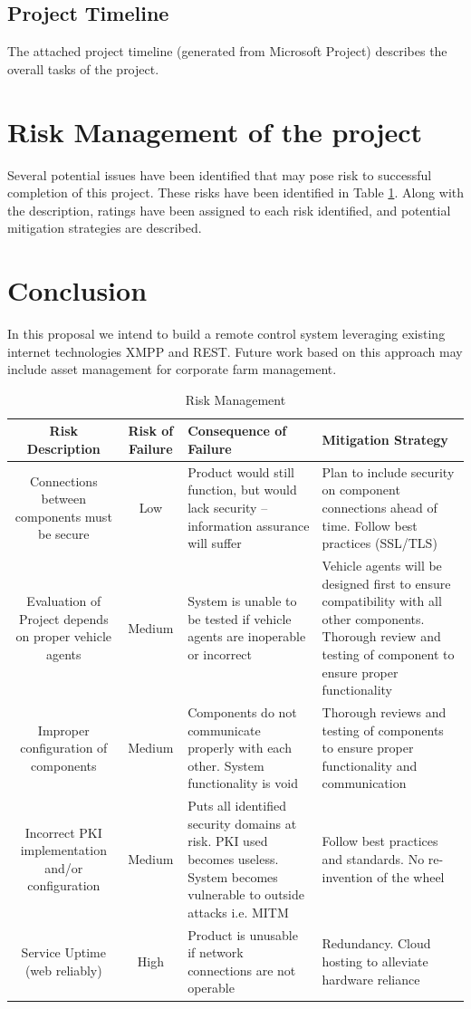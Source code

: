 \documentclass[conference,12pt]{IEEEtran}
\begin{document}
\subsection{Project Timeline}
The attached project timeline (generated from Microsoft Project) describes the
overall tasks of the project.
\section{Risk Management of the project}
Several potential issues have been identified that may pose risk to successful
completion of this project. These risks have been identified in Table
\ref{tab:riskmanagement}. Along with the description, ratings have been assigned
to each risk identified, and potential mitigation strategies are described.

\section{Conclusion}
In this proposal we intend to build a remote control system leveraging existing
internet technologies XMPP and REST. Future work based on this approach may
include asset management for corporate farm management.


\printbibliography
\clearpage
\begin{landscape}
\begin{table}%
\caption{Risk Management}
\label{tab:riskmanagement}
\centering
\begin{tabular}{c||c||p{2in}||p{2in}}
\hline
\bfseries Risk Description & \bfseries Risk of Failure & \bfseries Consequence of Failure & \bfseries Mitigation Strategy\\
\hline\hline
Connections between components must be secure
& Low
& Product would still function, but would lack security – information assurance will suffer
& Plan to include security on component connections ahead of time. Follow best practices (SSL/TLS)\\
\hline
Evaluation of Project depends on proper vehicle agents
& Medium
& System is unable to be tested if vehicle agents are inoperable or incorrect
& Vehicle agents will be designed first to ensure compatibility with all other components. Thorough review and testing of component to ensure proper functionality\\
\hline
Improper configuration of components
& Medium
& Components do not communicate properly with each other. System functionality is void
& Thorough reviews and testing of components to ensure proper functionality and communication\\
\hline
Incorrect PKI implementation and/or configuration
& Medium
& Puts all identified security domains at risk. PKI used becomes useless. System becomes vulnerable to outside attacks i.e. MITM
& Follow best practices and standards. No re-invention of the wheel\\
\hline
Service Uptime (web reliably)
& High
& Product is unusable if network connections are not operable
& Redundancy. Cloud hosting to alleviate hardware reliance\\
\hline
\end{tabular}
\end{table}
\end{landscape}
\end{document}
